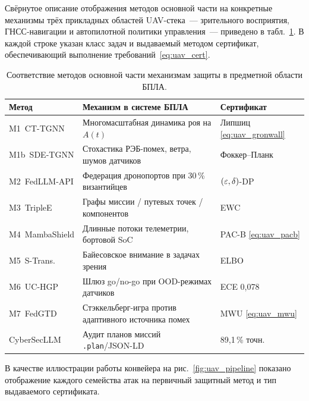 Свёрнутое описание отображения методов основной части на конкретные
механизмы трёх прикладных областей UAV-стека~--- зрительного восприятия,
ГНСС-навигации и автопилотной политики управления~--- приведено в
табл.~\ref{tab:uav_mapping}. В каждой строке указан класс задач и
выдаваемый методом сертификат, обеспечивающий выполнение
требований~\eqref{eq:uav_cert}.

\begin{table}[t]
\centering
\caption{Соответствие методов основной части механизмам защиты в
предметной области БПЛА.}
\label{tab:uav_mapping}
\small
\setlength{\tabcolsep}{4pt}
\renewcommand{\arraystretch}{1.2}
\begin{tabularx}{\linewidth}{@{}lXl@{}}
\toprule
\textbf{Метод} & \textbf{Механизм в системе БПЛА} & \textbf{Сертификат}\\
\midrule
\textsf{M1~CT-TGNN}    & Многомасштабная динамика роя на $A(t)$               & Липшиц \eqref{eq:uav_gronwall}\\
\textsf{M1b~SDE-TGNN}  & Стохастика РЭБ-помех, ветра, шумов датчиков          & Фоккер--Планк\\
\textsf{M2~FedLLM-API} & Федерация дронопортов при 30\,\% византийцев         & $(\varepsilon,\delta)$-DP\\
\textsf{M3~TripleE}    & Графы миссии / путевых точек / компонентов           & EWC\\
\textsf{M4~MambaShield}& Длинные потоки телеметрии, бортовой SoC               & PAC-B \eqref{eq:uav_pacb}\\
\textsf{M5~S-Trans.}   & Байесовское внимание в задачах зрения                & ELBO\\
\textsf{M6~UC-HGP}     & Шлюз go/no-go при OOD-режимах датчиков               & ECE 0,078\\
\textsf{M7~FedGTD}     & Стэккельберг-игра против адаптивного источника помех & MWU \eqref{eq:uav_mwu}\\
\textsf{CyberSecLLM}   & Аудит планов миссий \texttt{.plan}/JSON-LD           & 89,1\,\% точн.\\
\bottomrule
\end{tabularx}
\end{table}

В качестве иллюстрации работы конвейера на рис.~\ref{fig:uav_pipeline}
показано отображение каждого семейства атак на первичный защитный
метод и тип выдаваемого сертификата.

